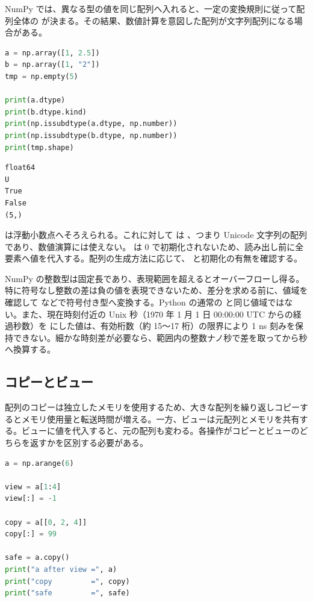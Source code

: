 NumPy では、異なる型の値を同じ配列へ入れると、一定の変換規則に従って配列全体の  が決まる。その結果、数値計算を意図した配列が文字列配列になる場合がある。

\begin{lstlisting}[language=Python]
a = np.array([1, 2.5])
b = np.array([1, "2"])
tmp = np.empty(5)

print(a.dtype)
print(b.dtype.kind)
print(np.issubdtype(a.dtype, np.number))
print(np.issubdtype(b.dtype, np.number))
print(tmp.shape)
\end{lstlisting}

\begin{lstlisting}[numbers=none, xleftmargin=2\zw]
float64
U
True
False
(5,)
\end{lstlisting}

 は浮動小数点へそろえられる。これに対して  は 、つまり Unicode 文字列の配列であり、数値演算には使えない。 は 0 で初期化されないため、読み出し前に全要素へ値を代入する。配列の生成方法に応じて、 と初期化の有無を確認する。

NumPy の整数型は固定長であり、表現範囲を超えるとオーバーフローし得る。特に符号なし整数の差は負の値を表現できないため、差分を求める前に、値域を確認して  などで符号付き型へ変換する。Python の通常の  と同じ値域ではない。また、現在時刻付近の Unix 秒（1970 年 1 月 1 日 00:00:00 UTC からの経過秒数）を  にした値は、有効桁数（約 15～17 桁）の限界により 1 ns 刻みを保持できない。細かな時刻差が必要なら、範囲内の整数ナノ秒で差を取ってから秒へ換算する。

\subsection{コピーとビュー}

配列のコピーは独立したメモリを使用するため、大きな配列を繰り返しコピーするとメモリ使用量と転送時間が増える。一方、ビューは元配列とメモリを共有する。ビューに値を代入すると、元の配列も変わる。各操作がコピーとビューのどちらを返すかを区別する必要がある。

\begin{lstlisting}[language=Python]
a = np.arange(6)

view = a[1:4]
view[:] = -1

copy = a[[0, 2, 4]]
copy[:] = 99

safe = a.copy()
print("a after view =", a)
print("copy         =", copy)
print("safe         =", safe)
\end{lstlisting}

